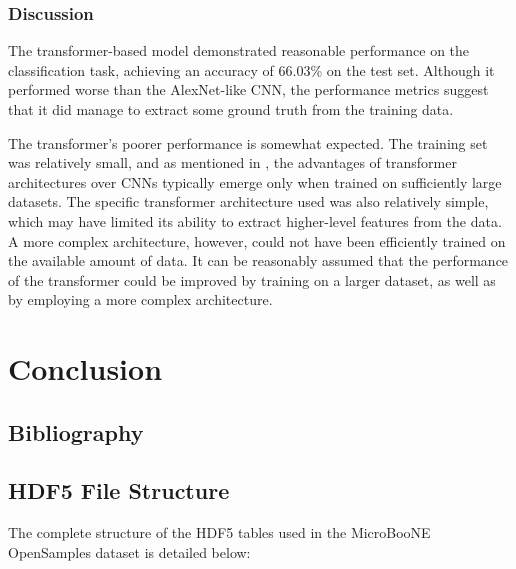 \documentclass{pracalicmgr}
\begin{document}
\subsection{Discussion}

The transformer-based model demonstrated reasonable performance on the classification task, achieving an accuracy of 66.03\% on the test set. Although it performed worse than the AlexNet-like CNN, the performance metrics suggest that it did manage to extract some ground truth from the training data.

The transformer's poorer performance is somewhat expected. The training set was relatively small, and as mentioned in \cite{ViT}, the advantages of transformer architectures over CNNs typically emerge only when trained on sufficiently large datasets. The specific transformer architecture used was also relatively simple, which may have limited its ability to extract higher-level features from the data. A more complex architecture, however, could not have been efficiently trained on the available amount of data. It can be reasonably assumed that the performance of the transformer could be improved by training on a larger dataset, as well as by employing a more complex architecture.

\chapter{Conclusion}

\newpage

\section{Bibliography}




\appendix

\section{HDF5 File Structure}
\label{app:hdf5_structure}

The complete structure of the HDF5 tables used in the MicroBooNE OpenSamples dataset is detailed below:
\end{document}
